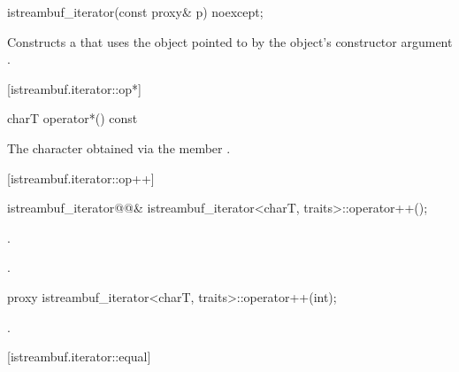 %
\begin{itemdecl}
istreambuf_iterator(const proxy& p) noexcept;
\end{itemdecl}

\begin{itemdescr}
\pnum
\effects
Constructs a
that uses the
object pointed to by the
object's constructor argument .
\end{itemdescr}

[istreambuf.iterator::op*]{}

%
\begin{itemdecl}
charT operator*() const
\end{itemdecl}

\begin{itemdescr}
\pnum
\returns
The character obtained via the
member
.
\end{itemdescr}

[istreambuf.iterator::op++]{}

%
\begin{itemdecl}
istreambuf_iterator@@&
    istreambuf_iterator<charT, traits>::operator++();
\end{itemdecl}

\begin{itemdescr}
\pnum
\effects {}
.

\pnum
\returns
{}.
\end{itemdescr}

%
%
\begin{itemdecl}
proxy istreambuf_iterator<charT, traits>::operator++(int);
\end{itemdecl}

\begin{itemdescr}
\pnum
\oldtxt{\returns}
.
\end{itemdescr}

[istreambuf.iterator::equal]{}

